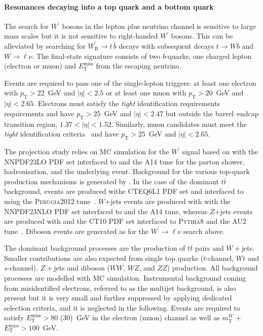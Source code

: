 \paragraph*{Resonances decaying into a top quark and a bottom quark}

The search for $W^\prime$ bosons in the lepton plus neutrino channel is sensitive to large
mass scales but it is not sensitive to right-handed $W^\prime$ bosons.
This can be alleviated by searching for $W^\prime_{\mathrm{R}} \to t\,\bar{b}$ decays
with subsequent decays $t \to W b$ and $W \to \ell \nu$. 
The final-state signature consists of two $b$-quarks, one charged lepton (electron or muon) and 
$E_{\mathrm{T}}^{\mathrm{miss}}$ from the escaping neutrino. 

Events are required to pass one of the single-lepton triggers: at least one electron
with $p_\mathrm{T} > 22$~GeV and $|\eta|<2.5$ or
at least one muon with $p_\mathrm{T} > 20$~GeV and $|\eta|<2.65$. 
Electrons must satisfy the \textit{tight} identification requirements~\cite{PERF-2013-03} 
requirements and have $p_\mathrm{T} > 25$~GeV and $|\eta| < 2.47$ but outside the barrel--endcap
transition region, $1.37 < |\eta| < 1.52$.
Similarly, muon candidates must meet the \textit{tight} identification criteria~\cite{PERF-2015-10} 
and have $p_\mathrm{T} >25$~GeV and $|\eta| <2.65$. 

The projection study relies on MC simulation for the $W^\prime$ signal
based on \MGvATNLO  with the \textsc{NNPDF23LO} PDF set interfaced to  and the A14 tune for the parton shower, hadronisation, and the underlying event. Background for the various top-quark production mechanisms is generated by \powhegbox. In the case of the dominant $t\bar{t}$ background, events are produced withe \textsc{CTEQ6L1} PDF set and interfaced to  using the \textsc{Perugia2012} tune~\cite{Skands:2010ak}. $W$+jets events are produced with \MGvATNLO with the \textsc{NNPDF23NLO} PDF set interfaced to  and the A14 tune, whereas $Z$+jets events are produced with \powhegbox and the \textsc{CT10} PDF set interfaced to \textsc{Pythia8} and the AU2 tune~\cite{ATL-PHYS-PUB-2012-003}. Diboson events are generated as for the $W^\prime \to \ell\nu$ search above.

The dominant background processes are the production of $t\bar{t}$ pairs and $W+$jets. 
Smaller contributions are also expected from single top quarks ($t$-channel, $Wt$ and $s$-channel), 
$Z+$jets and diboson ($WW$, $WZ$, and $ZZ$) production. 
All background processes are modelled with MC simulation. 
Instrumental background coming from misidentified electrons, referred to as the multijet 
background, is also present but it is very small and further suppressed by applying dedicated 
selection criteria, and it is neglected in the following.
Events are required to satisfy $E_{\mathrm{T}}^{\mathrm{miss}}>80$ (30)~GeV in the electron (muon)
channel as well as $m_{\textrm{T}}^W$ + $E_{\mathrm{T}}^{\mathrm{miss}} > 100$~GeV.

